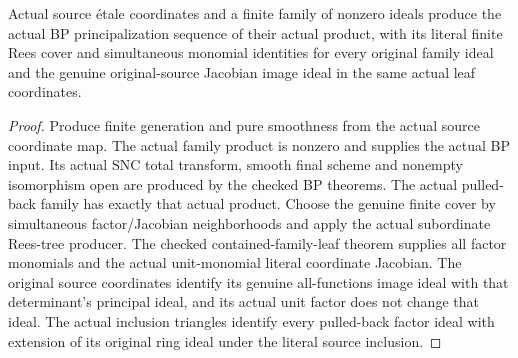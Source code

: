 \begin{theorem}\label{thm:sc0-bp-family-monomial-tree}
\leanok
{}
Actual source \'etale coordinates and a finite family of nonzero ideals
produce the actual BP principalization sequence of their actual product,
with its literal finite Rees cover and simultaneous monomial identities for
every original family ideal and the genuine original-source Jacobian image
ideal in the same actual leaf coordinates.
\end{theorem}
\begin{proof}
Produce finite generation and pure smoothness from the actual source
coordinate map. The actual family product is nonzero and supplies the actual
BP input. Its actual SNC total transform, smooth final scheme and nonempty
isomorphism open are produced by the checked BP theorems. The actual pulled-back
family has exactly that actual product. Choose the genuine finite cover by
simultaneous factor/Jacobian neighborhoods and apply the actual subordinate
Rees-tree producer. The checked contained-family-leaf theorem supplies all
factor monomials and the actual unit-monomial literal coordinate Jacobian.
The original source coordinates identify its genuine all-functions image
ideal with that determinant's principal ideal, and its actual unit factor
does not change that ideal. The actual inclusion triangles identify every
pulled-back factor ideal with extension of its original ring ideal under the
literal source inclusion.
\end{proof}

